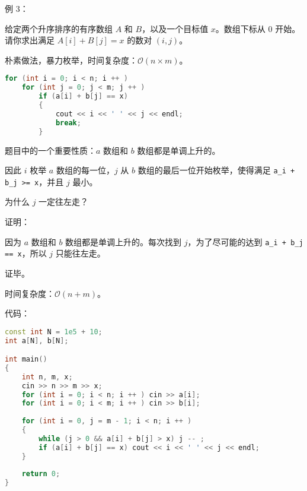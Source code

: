 例 $3$：

给定两个升序排序的有序数组 $A$ 和 $B$，以及一个目标值 $x$。数组下标从 $0$ 开始。请你求出满足 $A[i] + B[j] = x$ 的数对 $(i, j)$。

朴素做法，暴力枚举，时间复杂度：$\mathcal{O}(n \times m)$。

\begin{lstlisting}[language=cpp]
for (int i = 0; i < n; i ++ )   
    for (int j = 0; j < m; j ++ )
        if (a[i] + b[j] == x)
        {
            cout << i << ' ' << j << endl; 
            break;
        }
\end{lstlisting}

题目中的一个重要性质：$a$ 数组和 $b$ 数组都是单调上升的。

因此 $i$ 枚举 $a$ 数组的每一位，$j$ 从 $b$ 数组的最后一位开始枚举，使得满足 \verb|a_i + b_j >= x|，并且 $j$ 最小。

为什么 $j$ 一定往左走？

证明：

因为 $a$ 数组和 $b$ 数组都是单调上升的。每次找到 $j$，为了尽可能的达到 \verb|a_i + b_j == x|，所以 $j$ 只能往左走。

证毕。

时间复杂度：$\mathcal{O}(n + m)$。

代码：

\begin{lstlisting}[language=cpp]
const int N = 1e5 + 10;
int a[N], b[N];

int main()
{
    int n, m, x;
    cin >> n >> m >> x;
    for (int i = 0; i < n; i ++ ) cin >> a[i];
    for (int i = 0; i < m; i ++ ) cin >> b[i];
    
    for (int i = 0, j = m - 1; i < n; i ++ )
    {
        while (j > 0 && a[i] + b[j] > x) j -- ;
        if (a[i] + b[j] == x) cout << i << ' ' << j << endl;
    }
    
    return 0;
}
\end{lstlisting}